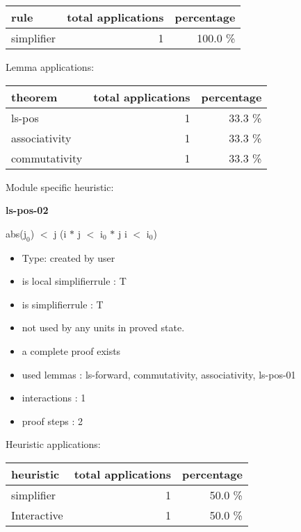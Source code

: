 \documentclass[a4paper]{article}
\begin{document}
\begin{supertabular}{l|r|r}
rule	        & total applications & percentage \\ \hline
simplifier & 1 & 100.0 \% \\

\end{supertabular}

Lemma applications:

\begin{supertabular}{l|r|r}
theorem	        & total applications & percentage \\ \hline
ls-pos & 1 & 33.3 \% \\
associativity & 1 & 33.3 \% \\
commutativity & 1 & 33.3 \% \\

\end{supertabular}

Module specific heuristic:

\pagebreak

{\LARGE\bf ls-pos-02}\label{lemma-ls-pos-02}

\medskip

 \Fol abs($\mbox{j}_{0}$) $<$ j \Imp (i $*$ j $<$ $\mbox{i}_{0}$ $*$ j \Equiv i $<$ $\mbox{i}_{0}$)

\begin{itemize}

\item Type: created by user

\item is local simplifierrule : T
\item is simplifierrule : T
\item not used by any units in proved state.
\item       a complete proof exists
\item       used lemmas  : ls-forward, commutativity, associativity, ls-pos-01
\item       interactions : 1
\item       proof steps  : 2
\end{itemize}

\medskip


Heuristic applications:

\begin{supertabular}{l|r|r}
heuristic	& total applications & percentage \\ \hline
simplifier & 1 & 50.0 \% \\
Interactive & 1 & 50.0 \% \\

\end{supertabular}
\end{document}
